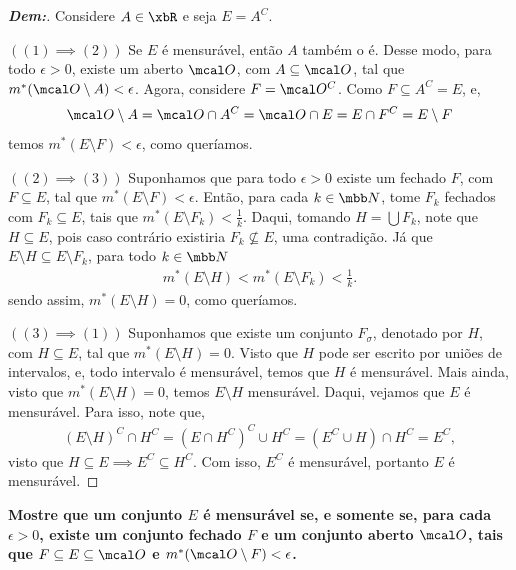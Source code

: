 \bigline
\begin{proof}[\textbf{Dem:}] Considere $A \in \xbR$ e seja $E = A^C$. 

\noindent
  $((1) \implies (2))$ Se $E$ é mensurável, então $A$ também o é. Desse modo, 
  para todo $\epsilon > 0$, existe um aberto $\mcal O$, com $A \subseteq \mcal O$, 
  tal que $m^*(\mcal O \setminus A) < \epsilon$. Agora, considere $F = \mcal O^C$. 
  Como $F \subseteq A^C = E$, e, 
  \begin{align*}
    \mcal O \setminus A = \mcal O \cap A^C = \mcal O \cap E = E\cap F^C = E\setminus F
  \end{align*}
  temos $m^*(E\setminus F) < \epsilon$, como queríamos.

  \noindent
  $((2) \implies (3))$ Suponhamos que para todo $\epsilon > 0$ existe um fechado $F$,
  com $F \subseteq E$, tal que $m^*(E\setminus F) < \epsilon$. Então, para cada $k \in \mbb N$,
  tome $F_k$ fechados com $F_k \subseteq E$, tais que $m^*(E\setminus F_k)< 
  \frac{1}{k}$. Daqui, tomando $H = \bigcup F_k$, note que $H \subseteq E$, pois caso contrário
  existiria $F_k \not \subseteq E$, uma contradição. Já que $E\setminus H 
  \subseteq E\setminus F_k$, para todo $k \in \mbb N$
  \begin{align*}
    m^*(E\setminus H) < m^*(E\setminus F_k) < \frac{1}{k}. 
  \end{align*}
  sendo assim, $m^*(E\setminus H) = 0$, como queríamos.
  
  \noindent
  $((3) \implies (1))$ Suponhamos que existe um conjunto $F_\sigma$, denotado 
  por $H$, com $H \subseteq E$, tal que $m^*(E\setminus H) = 0$. Visto que $H$ pode 
  ser escrito por uniões de intervalos, e, todo intervalo é mensurável, temos 
  que $H$ é mensurável. Mais ainda, visto que $m^*(E \setminus H) = 0$, 
  temos $E\setminus H$ mensurável. Daqui, vejamos que $E$ é mensurável. Para isso, 
  note que, 
  \begin{align*}
    (E\setminus H)^C\cap H^C = (E \cap H^C)^C \cup H^C = (E^C \cup H) \cap H^C
    = E^C,
  \end{align*}
  visto que $H\subseteq E \implies E^C \subseteq H^C$. Com isso, $E^C$ é mensurável,
  portanto $E$ é mensurável.
\end{proof}
\biglinend
\newpage
{}
\myexe{\thedois}
\bigline 
\textbf{Mostre que um conjunto $E$ é mensurável se, e somente se, para cada $\epsilon > 0$, 
existe um conjunto fechado $F$ e um conjunto aberto $\mcal O$, tais que 
$F \subseteq E \subseteq \mcal O$ e $m^*(\mcal O\setminus F) < \epsilon$.}
